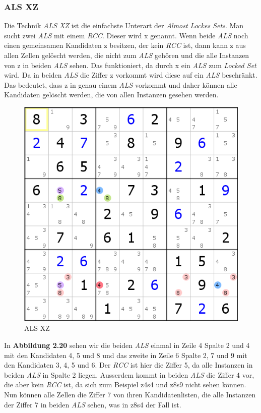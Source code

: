\newpage
\subsubsection{ALS XZ}
Die Technik \textit{ALS XZ} ist die einfachste Unterart der \textit{Almost Lockes Sets}. Man sucht zwei \textit{ALS} mit einem \textit{RCC}. Dieser wird x genannt. Wenn beide \textit{ALS} noch einen gemeinsamen Kandidaten z besitzen, der kein \textit{RCC} ist, dann kann z aus allen Zellen gelöscht werden, die nicht zum \textit{ALS} gehören und die alle Instanzen von z in beiden \textit{ALS} sehen. Das funktioniert, da durch x ein \textit{ALS} zum \textit{Locked Set} wird. Da in beiden \textit{ALS} die Ziffer z vorkommt wird diese auf ein \textit{ALS} beschränkt. Das bedeutet, dass z in genau einem \textit{ALS} vorkommt und daher können alle Kandidaten gelöscht werden, die von allen Instanzen gesehen werden.

\begin{figure}[h]
\begin{center}
\includegraphics{./img/ALS_XZ.png}
\caption{ALS XZ}
\end{center}
\end{figure}

\noindent In \textbf{Abbildung 2.20} sehen wir die beiden \textit{ALS} einmal in Zeile 4 Spalte 2 und 4 mit den Kandidaten 4, 5 und 8 und das zweite in Zeile 6 Spalte 2, 7 und 9 mit den Kandidaten 3, 4, 5 und 6. Der \textit{RCC} ist hier die Ziffer 5, da alle Instanzen in beiden \textit{ALS} in Spalte 2 liegen. Ausserdem kommt in beiden \textit{ALS} die Ziffer 4 vor, die aber kein \textit{RCC} ist, da sich zum Beispiel z4s4 und z8s9 nicht sehen können. Nun können alle Zellen die Ziffer 7 von ihren Kandidatenlisten, die alle Instanzen der Ziffer 7 in beiden \textit{ALS} sehen, was in z8s4 der Fall ist.